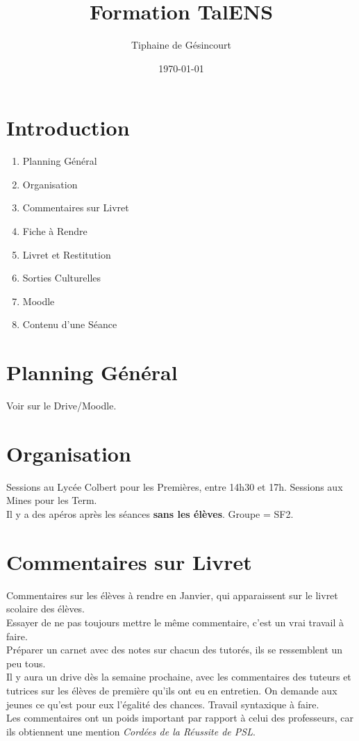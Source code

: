 \documentclass{cours}
\title{Formation TalENS}
\date{\today}
\author{Tiphaine de Gésincourt}
\begin{document}
\section*{Introduction}
\begin{enumerate}
    \item Planning Général
    \item Organisation
    \item Commentaires sur Livret
    \item Fiche à Rendre
    \item Livret et Restitution
    \item Sorties Culturelles 
    \item Moodle
    \item Contenu d'une Séance
\end{enumerate}

\section{Planning Général}
Voir sur le Drive/Moodle.\\


\section{Organisation}
Sessions au Lycée Colbert pour les Premières, entre 14h30 et 17h. Sessions aux Mines pour les Term.\\
Il y a des apéros après les séances \textbf{sans les élèves}. Groupe = SF2.

\section{Commentaires sur Livret}
Commentaires sur les élèves à rendre en Janvier, qui apparaissent sur le livret scolaire des élèves. \\
Essayer de ne pas toujours mettre le même commentaire, c'est un vrai travail à faire. \\
Préparer un carnet avec des notes sur chacun des tutorés, ils se ressemblent un peu tous. \\
Il y aura un drive dès la semaine prochaine, avec les commentaires des tuteurs et tutrices sur les élèves de première qu'ils ont eu en entretien. On demande aux jeunes ce qu'est pour eux l'égalité des chances. Travail syntaxique à faire. \\
Les commentaires ont un poids important par rapport à celui des professeurs, car ils obtiennent une mention \textsl{Cordées de la Réussite de PSL}.
\end{document}
